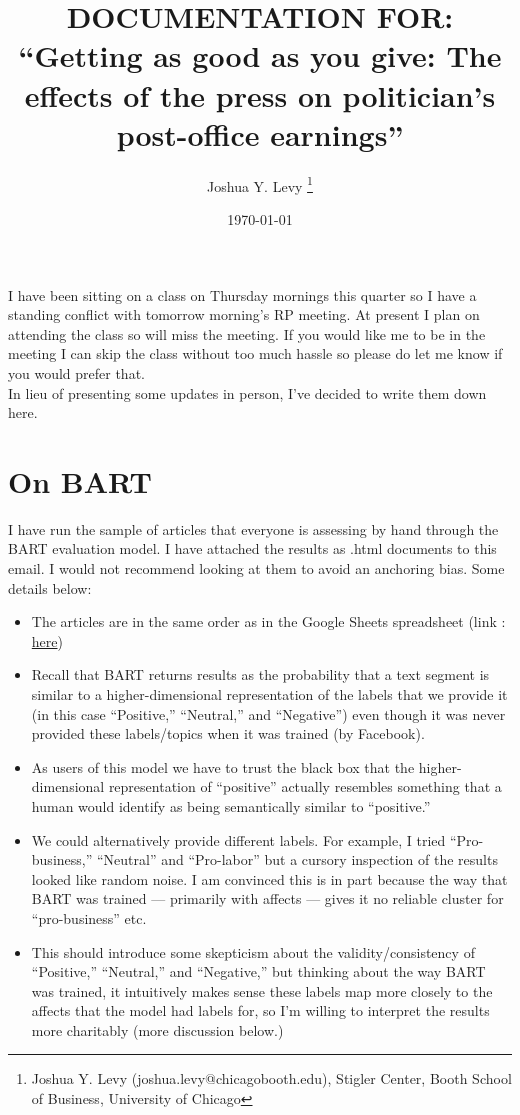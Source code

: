 \documentclass[11pt, letterpaper, twoside]{article}
\title{\singlespacing\textbf{DOCUMENTATION FOR: ``Getting as good as you give: The effects of the press on politician's post-office earnings''}}
\author{Joshua Y. Levy \thanks{Joshua Y. Levy  (joshua.levy@chicagobooth.edu), Stigler Center, Booth School of Business, University of Chicago}}
\date{\today}
\begin{document}
I have been sitting on a class on Thursday mornings this quarter so I have a standing conflict with tomorrow morning’s RP meeting. At present I plan on attending the class so will miss the meeting. If you would like me to be in the meeting I can skip the class without too much hassle so please do let me know if you would prefer that.\\

In lieu of presenting some updates in person, I’ve decided to write them down here.

\section{On BART}
I have run the sample of articles that everyone is assessing by hand through the BART evaluation model. I have attached the results as .html documents to this email. I would not recommend looking at them to avoid an anchoring bias. Some details below:
\begin{itemize}
    \item The articles are in the same order as in the Google Sheets spreadsheet (link : \href{https://docs.google.com/spreadsheets/d/1pAyZjfebuAAELv5U3dr8mIPi7aOjwIFjz2al4_369Rc/edit?usp=sharing}{here})
    \item Recall that BART returns results as the probability that a text segment is similar to a higher-dimensional representation of the labels that we provide it (in this case “Positive,” “Neutral,” and “Negative”) even though it was never provided these labels/topics when it was trained (by Facebook). 
    \item As users of this model we have to trust the black box that the higher-dimensional representation of “positive” actually resembles something that a human would identify as being semantically similar to “positive.”
    \item We could alternatively provide different labels. For example, I tried “Pro-business,” “Neutral” and “Pro-labor” but a cursory inspection of the results looked like random noise. I am convinced this is in part because the way that BART was trained --- primarily with affects --- gives it no reliable cluster for “pro-business” etc.
    \item This should introduce some skepticism about the validity/consistency of “Positive,” “Neutral,” and “Negative,” but thinking about the way BART was trained, it intuitively makes sense these labels map more closely to the affects that the model had labels for, so I’m willing to interpret the results more charitably (more discussion below.)  
\end{itemize}
\end{document}
